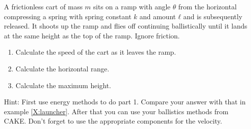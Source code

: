 \begin{exercise}
A frictionless cart of mass $m$ sits on a ramp with angle $θ$ from the horizontal compressing a spring with spring constant $k$ and amount $ℓ$ and is subsequently released. It shoots up the ramp and flies off continuing ballistically until it lands at the same height as the top of the ramp. Ignore friction.
\begin{enumerate}
\item Calculate the speed of the cart as it leaves the ramp. 
\item Calculate the horizontal range.
\item Calculate the maximum height. 
\end{enumerate}
Hint: First use energy methods to do part 1. Compare your answer with that in example \ref{X:launcher}. 
After that you can use your ballistics methods from CAKE. Don't forget to use the appropriate components for the velocity. 
\end{exercise}




